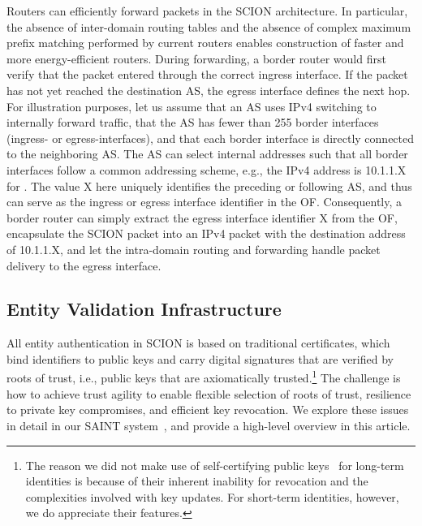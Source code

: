 \documentclass[a4paper]{llncs}
\newcommand\SCION{{\small\textsf{SCION}}\xspace}
\begin{document}
Routers can efficiently forward packets in the \SCION architecture. In
particular, the absence of inter-domain routing tables and the absence of
complex maximum prefix matching performed by current routers enables
construction of faster and more energy-efficient routers. During forwarding, a
border router would first verify that the packet entered through the correct
ingress interface. If the packet has not yet reached the destination AS, the
egress interface defines the next hop. For illustration purposes, let us assume
that an AS uses IPv4 switching to internally forward traffic, that the AS has
fewer than 255 border interfaces (ingress- or egress-interfaces), and that each
border interface is directly connected to the neighboring AS. The AS can select
internal addresses such that all border interfaces follow a common addressing
scheme, e.g., the IPv4 address is 10.1.1.X for . The value X here
uniquely identifies the preceding or following AS, and thus can serve as the
ingress or egress interface identifier in the OF. Consequently, a border router
can simply extract the egress interface identifier X from the OF, encapsulate
the \SCION packet into an IPv4 packet with the destination address of 10.1.1.X,
and let the intra-domain routing and forwarding handle packet delivery to the
egress interface. 



\subsection{Entity Validation Infrastructure}

All entity authentication in \SCION is based on traditional certificates, which
bind identifiers to public keys and carry digital signatures that are
verified by roots of trust, i.e., public keys that are axiomatically
trusted.\footnote{The reason we did not make use of self-certifying public
  keys~\cite{HIP,AIP} for long-term identities is because of their
  inherent inability for revocation and the complexities involved with key
  updates. For short-term identities, however, we do appreciate their features.}
The challenge is how to achieve trust agility to enable flexible selection of
roots of trust, resilience to private key compromises, and efficient key
revocation. We explore these issues in detail in our SAINT system~\cite{MRSKP2015},
and provide a high-level overview in this article.
\end{document}
